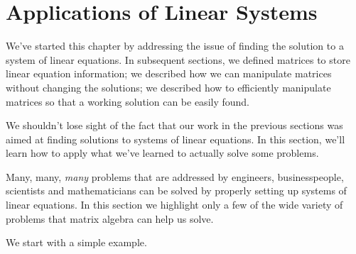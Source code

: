 \section{Applications of Linear Systems}\label{sec:solving_systems}


We've started this chapter by addressing the issue of finding the solution to a system of linear equations. In subsequent sections, we  defined matrices to store linear equation information; we described how we can manipulate matrices without changing the solutions; we described how to efficiently manipulate matrices so that a working solution can be easily found.

We shouldn't lose sight of the fact that  our work in the previous sections was aimed at finding solutions to systems of linear equations. In this section, we'll learn how to apply what we've learned to actually solve some problems. 

Many, many, \textit{many} problems that are addressed by engineers, businesspeople, scientists and mathematicians can be solved by properly setting up systems of linear equations. In this section we highlight only a few of the wide variety of problems that matrix algebra can help us solve.

We start with a simple example.\\

